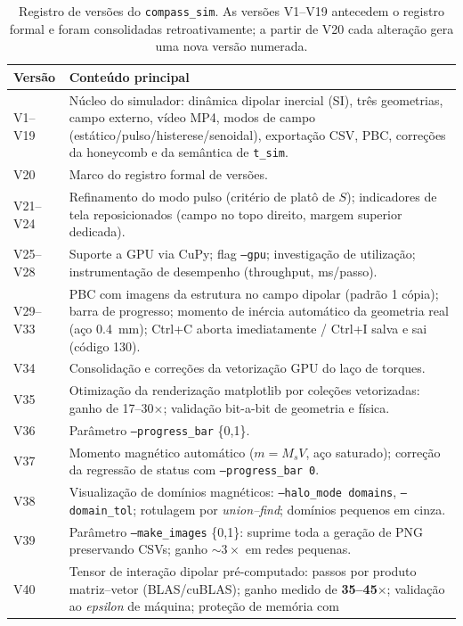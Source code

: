 \documentclass[11pt,a4paper]{article}
\newcommand{\code}[1]{\texttt{#1}}
\begin{document}
\begin{table}[h]
\centering
\small
\caption{Registro de versões do \code{compass\_sim}. As versões V1--V19
antecedem o registro formal e foram consolidadas retroativamente; a
partir de V20 cada alteração gera uma nova versão numerada.}
\label{tab:versoes}
\begin{tabular}{@{}lp{11.5cm}@{}}
\toprule
\textbf{Versão} & \textbf{Conteúdo principal} \\
\midrule
V1--V19 & Núcleo do simulador: dinâmica dipolar inercial (SI), três
geometrias, campo externo, vídeo MP4, modos de campo
(estático/pulso/histerese/senoidal), exportação CSV, PBC, correções da
honeycomb e da semântica de \code{t\_sim}. \\
V20 & Marco do registro formal de versões. \\
V21--V24 & Refinamento do modo pulso (critério de platô de $S$);
indicadores de tela reposicionados (campo no topo direito, margem
superior dedicada). \\
V25--V28 & Suporte a GPU via CuPy; flag \code{--gpu}; investigação de
utilização; instrumentação de desempenho (throughput, ms/passo). \\
V29--V33 & PBC com imagens da estrutura no campo dipolar (padrão 1
cópia); barra de progresso; momento de inércia automático da geometria
real (aço \SI{0.4}{mm}); Ctrl+C aborta imediatamente / Ctrl+I salva e
sai (código 130). \\
V34 & Consolidação e correções da vetorização GPU do laço de torques. \\
V35 & Otimização da renderização matplotlib por coleções vetorizadas:
ganho de 17--30$\times$; validação bit-a-bit de geometria e física. \\
V36 & Parâmetro \code{--progress\_bar} \{0,1\}. \\
V37 & Momento magnético automático ($m = M_s V$, aço saturado);
correção da regressão de status com \code{--progress\_bar 0}. \\
V38 & Visualização de domínios magnéticos: \code{--halo\_mode domains},
\code{--domain\_tol}; rotulagem por \emph{union--find}; domínios pequenos
em cinza. \\
V39 & Parâmetro \code{--make\_images} \{0,1\}: suprime toda a geração
de PNG preservando CSVs; ganho $\sim 3\times$ em redes pequenas. \\
V40 & Tensor de interação dipolar pré-computado: passos por produto
matriz--vetor (BLAS/cuBLAS); ganho medido de \textbf{35--45$\times$};
validação ao \emph{epsilon} de máquina; proteção de memória com

\end{tabular}
\end{table}
\end{document}
